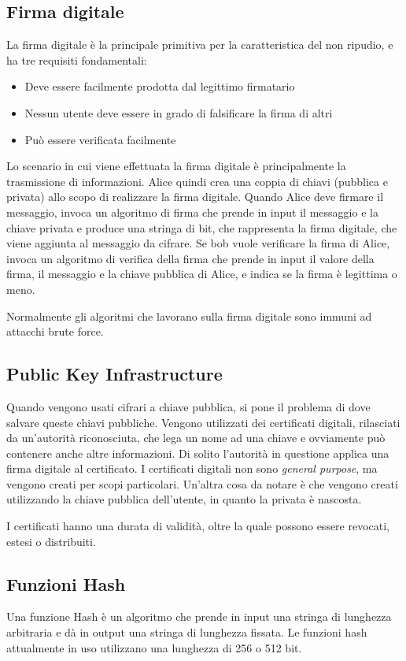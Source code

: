 \subsection{Firma digitale}
La firma digitale è la principale primitiva per la caratteristica del non ripudio, e ha tre requisiti fondamentali:
\begin{itemize}
    \item Deve essere facilmente prodotta dal legittimo firmatario
    \item Nessun utente deve essere in grado di falsificare la firma di altri
    \item Può essere verificata facilmente
\end{itemize}
Lo scenario in cui viene effettuata la firma digitale è principalmente la trasmissione di informazioni. Alice quindi crea una coppia di chiavi (pubblica e privata) allo scopo di realizzare la firma digitale. Quando Alice deve firmare il messaggio, invoca un algoritmo di firma che prende in input il messaggio e la chiave privata e produce una stringa di bit, che rappresenta la firma digitale, che viene aggiunta al messaggio da cifrare. Se bob vuole verificare la firma di Alice, invoca un algoritmo di verifica della firma che prende in input il valore della firma, il messaggio e la chiave pubblica di Alice, e indica se la firma è legittima o meno.

Normalmente gli algoritmi che lavorano sulla firma digitale sono immuni ad attacchi brute force.

\subsection{Public Key Infrastructure}
Quando vengono usati cifrari a chiave pubblica, si pone il problema di dove salvare queste chiavi pubbliche. Vengono utilizzati dei certificati digitali, rilasciati da un'autorità riconosciuta, che lega un nome ad una chiave e ovviamente può contenere anche altre informazioni. Di solito l'autorità in questione applica una firma digitale al certificato. I certificati digitali non sono \textit{general purpose}, ma vengono creati per scopi particolari. Un'altra cosa da notare è che vengono creati utilizzando la chiave pubblica dell'utente, in quanto la privata è nascosta.

I certificati hanno una durata di validità, oltre la quale possono essere revocati, estesi o distribuiti.

\subsection{Funzioni Hash}
Una funzione Hash è un algoritmo che prende in input una stringa di lunghezza arbitraria e dà in output una stringa di lunghezza fissata. Le funzioni hash attualmente in uso utilizzano una lunghezza di 256 o 512 bit.

